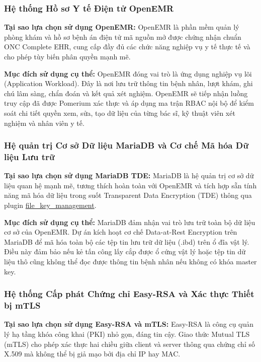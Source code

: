 \subsubsection{Hệ thống Hồ sơ Y tế Điện tử OpenEMR}

\textbf{Tại sao lựa chọn sử dụng OpenEMR:} OpenEMR là phần mềm quản lý phòng khám và hồ sơ bệnh án điện tử mã nguồn mở được chứng nhận chuẩn ONC Complete EHR, cung cấp đầy đủ các chức năng nghiệp vụ y tế thực tế và cho phép tùy biến phân quyền mạnh mẽ.

\textbf{Mục đích sử dụng cụ thể:} OpenEMR đóng vai trò là ứng dụng nghiệp vụ lõi (Application Workload). Đây là nơi lưu trữ thông tin bệnh nhân, lượt khám, ghi chú lâm sàng, chẩn đoán và kết quả xét nghiệm. OpenEMR sẽ tiếp nhận luồng truy cập đã được Pomerium xác thực và áp dụng ma trận RBAC nội bộ để kiểm soát chi tiết quyền xem, sửa, tạo dữ liệu của từng bác sĩ, kỹ thuật viên xét nghiệm và nhân viên y tế.

\subsubsection{Hệ quản trị Cơ sở Dữ liệu MariaDB và Cơ chế Mã hóa Dữ liệu Lưu trữ}

\textbf{Tại sao lựa chọn sử dụng MariaDB TDE:} MariaDB là hệ quản trị cơ sở dữ liệu quan hệ mạnh mẽ, tương thích hoàn toàn với OpenEMR và tích hợp sẵn tính năng mã hóa dữ liệu trong suốt Transparent Data Encryption (TDE) thông qua plugin \url{file_key_management}.

\textbf{Mục đích sử dụng cụ thể:} MariaDB đảm nhận vai trò lưu trữ toàn bộ dữ liệu cơ sở của OpenEMR. Dự án kích hoạt cơ chế Data-at-Rest Encryption trên MariaDB để mã hóa toàn bộ các tệp tin lưu trữ dữ liệu (.ibd) trên ổ đĩa vật lý. Điều này đảm bảo nếu kẻ tấn công lấy cắp được ổ cứng vật lý hoặc tệp tin dữ liệu thô cũng không thể đọc được thông tin bệnh nhân nếu không có khóa master key.

\subsubsection{Hệ thống Cấp phát Chứng chỉ Easy-RSA và Xác thực Thiết bị mTLS}

\textbf{Tại sao lựa chọn sử dụng Easy-RSA và mTLS:} Easy-RSA là công cụ quản lý hạ tầng khóa công khai (PKI) nhỏ gọn, đáng tin cậy. Giao thức Mutual TLS (mTLS) cho phép xác thực hai chiều giữa client và server thông qua chứng chỉ số X.509 mà không thể bị giả mạo bởi địa chỉ IP hay MAC.

